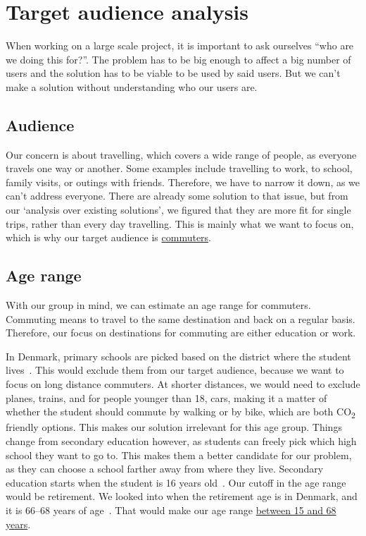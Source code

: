 \section{Target audience analysis}\label{sec:target-audience-analysis}

When working on a large scale project, it is important to ask ourselves ``who are we doing this for?''.
The problem has to be big enough to affect a big number of users and the solution has to be viable to be used by said
users.
But we can't make a solution without understanding who our users are.

\subsection{Audience}\label{subsec:audience}

Our concern is about travelling, which covers a wide range of people, as everyone travels one way or another.
Some examples include travelling to work, to school, family visits, or outings with friends.
Therefore, we have to narrow it down, as we can't address everyone.
There are already some solution to that issue, but from our `analysis over existing solutions', we figured that they are
more fit for single trips, rather than every day travelling.
This is mainly what we want to focus on, which is why our target audience is \underline{commuters}.

\subsection{Age range}\label{subsec:age-range}

With our group in mind, we can estimate an age range for commuters.
Commuting means to travel to the same destination and back on a regular basis.
Therefore, our focus on destinations for commuting are either education or work.

In Denmark, primary schools are picked based on the district where the student lives~\cite{primary_school}.
This would exclude them from our target audience, because we want to focus on long distance commuters.
At shorter distances, we would need to exclude planes, trains, and for people younger than 18, cars, making it a matter
of whether the student should commute by walking or by bike, which are both \unit{CO_{2}} friendly options.
This makes our solution irrelevant for this age group.
Things change from secondary education however, as students can freely pick which high school they want to go to.
This makes them a better candidate for our problem, as they can choose a school farther away from where they live.
Secondary education starts when the student is 16 years old~\cite{secondary_school}.
Our cutoff in the age range would be retirement.
We looked into when the retirement age is in Denmark, and it is 66--68 years of age~\cite{retirement}.
That would make our age range \underline{between 15 and 68 years}.

